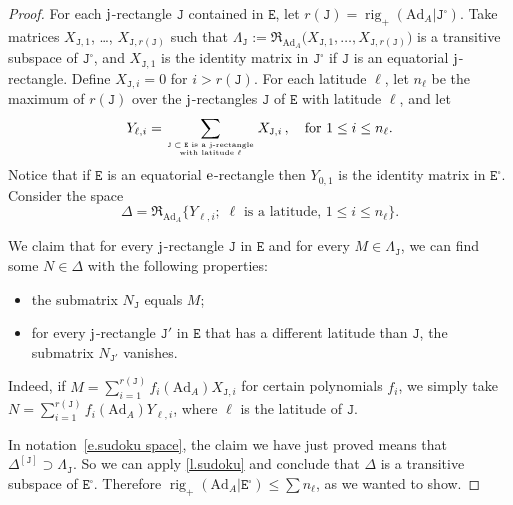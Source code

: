 \documentclass[10pt, a4paper]{amsart}
\theoremstyle{plain}
\theoremstyle{definition}
\theoremstyle{remark}
\theoremstyle{note}
\numberwithin{equation}{section}
\begin{document}
\begin{proof}
For each $\rm j$-rectangle ${\mathtt{J}}$ contained in ${\mathtt{E}}$,
let $r({\mathtt{J}}) = \operatorname{rig}_+ ({\mathrm{Ad}}_A|{\mathtt{J}}^\square)$.
Take matrices $X_{{\mathtt{J}}, 1}$, \dots, $X_{{\mathtt{J}}, r({\mathtt{J}})}$
such that 
$\Lambda_{\mathtt{J}} := {\mathfrak{R}}_{{\mathrm{Ad}}_A} \big( X_{{\mathtt{J}}, 1}, \ldots, X_{{\mathtt{J}}, r({\mathtt{J}})} \big)$
is a transitive subspace of ${\mathtt{J}}^\square$,
and $X_{{\mathtt{J}},1}$ is the identity matrix in ${\mathtt{J}}^\square$ if ${\mathtt{J}}$ is an equatorial ${\rm j}$-rectangle.
Define $X_{{\mathtt{J}}, i} = 0$ for $i>r({\mathtt{J}})$.		
For each latitude $\ell$, 
let $n_\ell$ be the maximum of $r({\mathtt{J}})$
over the $\rm j$-rectangles ${\mathtt{J}}$ of ${\mathtt{E}}$ with latitude $\ell$,
and let
$$
Y_{\ell, i} = \sum_{\text{\rm{${\mathtt{J}} \subset {\mathtt{E}}$ is a $\rm j$-rectangle}} \atop \text{\rm{with latitude $\ell$}}} 
X_{{\mathtt{J}}, i} \, ,
\quad \text{for $1 \le i \le n_\ell$.}
$$
Notice that if ${\mathtt{E}}$ is an equatorial $\rm e$-rectangle then $Y_{0,1}$ is 
the identity matrix in ${\mathtt{E}}^\square$.
Consider the space 
$$
\Delta = {\mathfrak{R}}_{{\mathrm{Ad}}_A} \big\{Y_{\ell,i} ; \; \ell \text{ is a latitude, } 1 \le i \le n_\ell \big\}.
$$

We claim that for every $\rm j$-rectangle ${\mathtt{J}}$ in ${\mathtt{E}}$ and for every $M \in \Lambda_{\mathtt{J}}$,
we can find some $N \in \Delta$ with the following properties:
\begin{itemize} 
\item the submatrix $N_{\mathtt{J}}$ equals $M$;
\item for every $\rm j$-rectangle ${\mathtt{J}}'$ in ${\mathtt{E}}$ that has a different latitude 
than ${\mathtt{J}}$, the submatrix $N_{{\mathtt{J}}'}$ vanishes.  
\end{itemize}
Indeed, if 
$M = \sum_{i=1}^{r({\mathtt{J}})} f_i({\mathrm{Ad}}_A) X_{{\mathtt{J}},i}$ for certain polynomials $f_i$,
we simply take 
$N = \sum_{i=1}^{r({\mathtt{J}})} f_i({\mathrm{Ad}}_A) Y_{\ell,i}$, where $\ell$ is the latitude of ${\mathtt{J}}$.

In notation~\eqref{e.sudoku space}, 
the claim we have just proved means that 
$\Delta^{[{\mathtt{J}}]} \supset \Lambda_{\mathtt{J}}$.
So we can apply \cref{l.sudoku} and conclude that
$\Delta$ is a transitive subspace of ${\mathtt{E}}^\square$.
Therefore $\operatorname{rig}_+ ({\mathrm{Ad}}_A | {\mathtt{E}}^\square) \le \sum n_\ell$,
as we wanted to show.
\end{proof}
\end{document}
